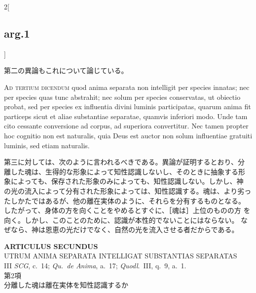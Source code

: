 \documentclass[paper=a4paper,fontsize=10pt,jafontsize=9pt,titlepage]{jlreq}
\begin{document}
\begin{paracol}{2}[\subsection{arg.1}]
\switchcolumn

第二の異論もこれについて論じている。

\switchcolumn*[\subsection{ad.3}]

{\scshape Ad tertium dicendum} quod anima separata non intelligit per species
innatas; nec per species quas tunc abstrahit; nec solum per species
conservatas, ut obiectio probat, sed per species ex influentia divini
luminis participatas, quarum anima fit particeps sicut et aliae
substantiae separatae, quamvis inferiori modo. Unde tam cito cessante
conversione ad corpus, ad superiora convertitur. Nec tamen propter hoc
cognitio non est naturalis, quia Deus est auctor non solum influentiae
gratuiti luminis, sed etiam naturalis.

\switchcolumn

第三に対しては、次のように言われるべきである。異論が証明するとおり、分
離した魂は、生得的な形象によって知性認識しないし、そのときに抽象する形
象によっても、保存された形象のみによっても、知性認識しない。しかし、神
の光の流入によって分有された形象によっては、知性認識する。魂は、より劣っ
たしかたではあるが、他の離在実体のように、それらを分有するものとなる。
したがって、身体の方を向くことをやめるとすぐに、［魂は］上位のものの方
を向く。しかし、このことのために、認識が本性的でないことにはならない。
なぜなら、神は恩恵の光だけでなく、自然の光を流入させる者だからである。

\end{paracol}
%
%
%

\newpage
{}

{}
\setcounter{section}{2}
\setcounter{subsection}{0}
\begin{center}
{\Large {\bfseries ARTICULUS SECUNDUS}}\\ {\large UTRUM ANIMA SEPARATA
INTELLIGAT SUBSTANTIAS SEPARATAS}\\ {\footnotesize III {\itshape SCG},
c.~14; {\itshape Qu.~de Anima}, a.~17; {\itshape Quodl}.~III, q.~9, a.~1.}\\
{\Large 第2項\\分離した魂は離在実体を知性認識するか}

\end{center}
\end{document}
